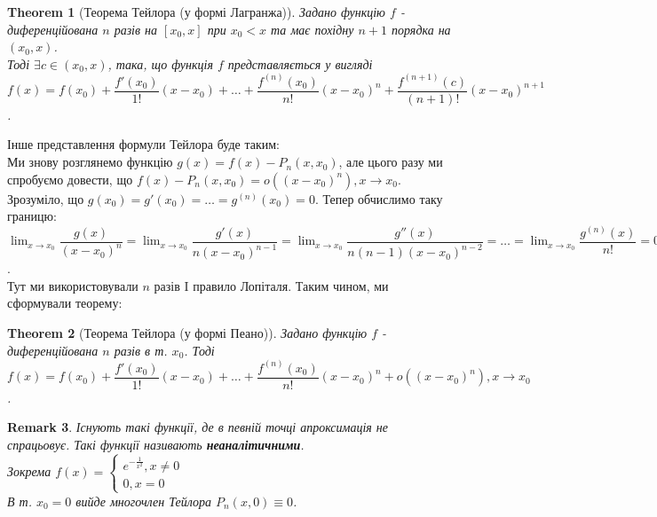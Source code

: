 \documentclass[a4paper, 14pt]{article}
\theoremstyle{theoremdd}
\newtheorem{theorem}{Theorem}[subsection]
\theoremstyle{theoremdd}
\theoremstyle{theoremdd}
\theoremstyle{theoremdd}
\theoremstyle{theoremdd}
\theoremstyle{theoremdd}
\newtheorem{remark}[theorem]{Remark}
\theoremstyle{theoremdd}
\theoremstyle{theoremdd}
\begin{document}
\begin{theorem}[Теорема Тейлора (у формі Лагранжа)]
Задано функцію $f$ - диференційована $n$ разів на $[x_0,x]$ при $x_0 < x$ та має похідну $n+1$ порядка на $(x_0,x)$.\\
Тоді $\exists c \in (x_0,x)$, така, що функція $f$ представляється у вигляді\\
$f(x) = f(x_0) + \dfrac{f'(x_0)}{1!}(x-x_0) + \dots + \dfrac{f^{(n)}(x_0)}{n!}(x-x_0)^n + \dfrac{f^{(n+1)}(c)}{(n+1)!}(x-x_0)^{n+1}$.
\end{theorem}
Інше представлення формули Тейлора буде таким:\\
Ми знову розглянемо функцію $g(x) = f(x) - P_n(x,x_0)$, але цього разу ми спробуємо довести, що $f(x) - P_n(x,x_0) = o((x-x_0)^n), x \to x_0$.\\
Зрозуміло, що $g(x_0) = g'(x_0) = \dots = g^{(n)}(x_0) = 0$. Тепер обчислимо таку границю:\\
$\displaystyle\lim_{x \to x_0} \dfrac{g(x)}{(x-x_0)^n} = \lim_{x \to x_0} \dfrac{g'(x)}{n(x-x_0)^{n-1}} = \lim_{x \to x_0} \dfrac{g''(x)}{n(n-1)(x-x_0)^{n-2}} = \dots = \lim_{x \to x_0} \dfrac{g^{(n)}(x)}{n!} = 0$.\\
Тут ми використовували $n$ разів I правило Лопіталя. Таким чином, ми сформували теорему:
\begin{theorem}[Теорема Тейлора (у формі Пеано)]
Задано функцію $f$ - диференційована $n$ разів в т. $x_0$. Тоді \\
$f(x) = f(x_0) + \dfrac{f'(x_0)}{1!}(x-x_0) + \dots + \dfrac{f^{(n)}(x_0)}{n!}(x-x_0)^n + o((x-x_0)^n), x \to x_0$.
\end{theorem}

\begin{remark}
Існують такі функції, де в певній точці апроксимація не спрацьовує. Такі функції називають \textbf{неаналітичними}.\\
Зокрема $f(x) = \begin{cases} e^{\textstyle -\frac{1}{x^2}}, x \neq 0 \\ 0, x = 0 \end{cases}$\\
В т. $x_0 = 0$ вийде многочлен Тейлора $P_n(x,0) \equiv 0$.\\
\begin{figure}[H]
\centering
{}
\end{figure}
\end{remark}
\end{document}
